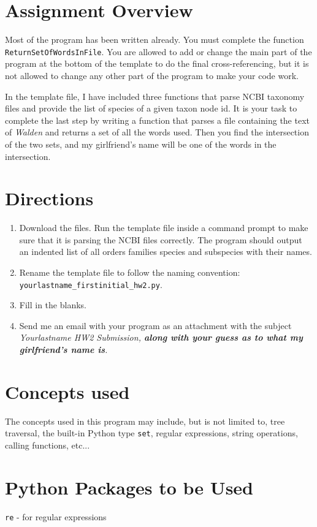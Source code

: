 \documentclass[11pt]{amsart}
\begin{document}
\section*{Assignment Overview}
Most of the program has been written already. You must complete the function \\ \texttt{ReturnSetOfWordsInFile}. You are allowed to add or change the main part of the program at the bottom of the template to do the final cross-referencing, but it is not allowed to change any other part of the program to make your code work.

In the template file, I have included three functions that parse NCBI taxonomy files and provide the list of species of a given taxon node id. It is your task to complete the last step by writing a function that parses a file containing the text of \textit{Walden} and returns a set of all the words used. Then you find the intersection of the two sets, and my girlfriend's name will be one of the words in the intersection.

\section*{Directions}
\begin{enumerate}
	\item Download the files. Run the template file inside a command prompt to make sure that it is parsing the NCBI files correctly. The program should output an indented list of all orders families species and subspecies with their names.
	\item Rename the template file to follow the naming convention: \\ \texttt{yourlastname_firstinitial_hw2.py}.
	\item Fill in the blanks.
	\item Send me an email with your program as an attachment with the subject \em{Yourlastname HW2 Submission}, \textbf{along with your guess as to what my girlfriend's name is}.
\end{enumerate}

\section*{Concepts used}
The concepts used in this program may include, but is not limited to, tree traversal, the built-in Python type \texttt{set}, regular expressions, string operations, calling functions, etc...

\section*{Python Packages to be Used}
\texttt{re} - for regular expressions
\end{document}
